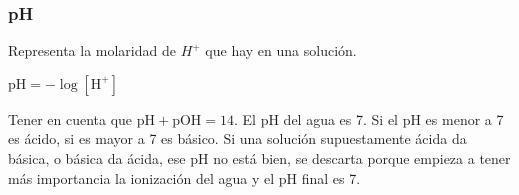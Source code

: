 \subsubsection*{pH}

Representa la molaridad de $H^+$ que hay en una solución.

\hfil$\text{pH} = -\log [\text{H}^+]$\hfil

Tener en cuenta que $\text{pH} + \text{pOH} = 14$. El pH del agua es 7. Si el pH es menor a 7 es ácido, si es mayor a 7 es básico. Si una solución supuestamente ácida da básica, o básica da ácida, ese pH no está bien, se descarta porque empieza a tener más importancia la ionización del agua y el pH final es 7.


